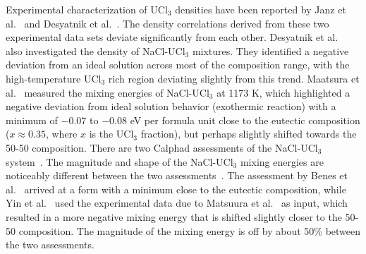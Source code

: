 \documentclass[preprint,3p,10pt,onecolumn,number,sort&compress]{elsarticle}
\begin{document}

Experimental characterization of UCl$_3$ densities have been reported by Janz et al.~\cite{Janz1988} and Desyatnik et al.~\cite{Desyatnik}. The density correlations derived from these two experimental data sets deviate significantly from each other. Desyatnik et al.~\cite{Desyatnik} also investigated the density of NaCl-UCl$_3$ mixtures. They identified a negative deviation from an ideal solution across most of the composition range, with the high-temperature UCl$_3$ rich region deviating slightly from this trend. 
Maatsura et al.~\cite{Matsuura} measured the mixing energies of NaCl-UCl$_3$ at 1173 K, which highlighted a negative deviation from ideal solution behavior (exothermic reaction) with a  minimum of $-0.07$ to $-0.08$ eV per formula unit close to the eutectic composition ($x\approx 0.35$, where $x$ is the UCl$_3$ fraction), but perhaps slightly shifted towards the 50-50 composition. There are two Calphad assessments of the NaCl-UCl$_3$ system~\cite{BENES2008, YIN2020}. The magnitude and shape of the NaCl-UCl$_3$ mixing energies are noticeably different between the two assessments~\cite{YIN2020}. The assessment by Benes et al.~\cite{BENES2008} arrived at a form with a minimum close to the eutectic composition, while Yin et al.~\cite{YIN2020} used the experimental data due to Matsuura et al.~\cite{Matsuura} as input, which resulted in a more negative mixing energy that is shifted slightly closer to the 50-50 composition. The magnitude of the mixing energy is off by about 50\% between the two assessments. 
\end{document}
